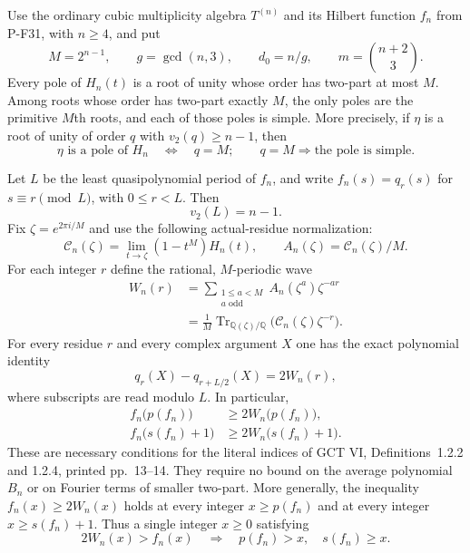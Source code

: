 \begin{proposition}
\label{prop:cubicpairedwave}
Use the ordinary cubic multiplicity algebra $T^{(n)}$ and its
Hilbert function $f_n$ from P-F31, with $n\ge4$, and put
\[
 M=2^{n-1},\qquad g=\gcd(n,3),\qquad d_0=n/g,
 \qquad m=\binom{n+2}{3}.
\]
Every pole of $H_n(t)$ is a root of unity whose order has
two-part at most $M$. Among roots whose order has two-part exactly
$M$, the only poles are the primitive $M$th roots, and each of
those poles is simple. More precisely, if $\eta$ is a root of
unity of order $q$ with $v_2(q)\ge n-1$, then
\[
 \eta\text{ is a pole of }H_n
       \quad\Longleftrightarrow\quad q=M;
 \qquad q=M\Longrightarrow\text{the pole is simple}.
 \tag{P-F56a}
\]

Let $L$ be the least quasipolynomial period of $f_n$, and write
$f_n(s)=q_r(s)$ for $s\equiv r\pmod L$, with
$0\le r<L$. Then
\[
                     v_2(L)=n-1.                            \tag{P-F56b}
\]
Fix $\zeta=e^{2\pi i/M}$ and use the following actual-residue normalization:
\[
 \mathcal C_n(\zeta)=\lim_{t\to\zeta}(1-t^M)H_n(t),
 \qquad A_n(\zeta)=\mathcal C_n(\zeta)/M.
\]
For each integer $r$ define the rational, $M$-periodic wave
\[
 \begin{split}
 W_n(r)
   &=\sum_{\substack{1\le a<M\\a\text{ odd}}}
                      A_n(\zeta^a)\zeta^{-ar}\\
   &=\frac1M\operatorname{Tr}_{\mathbb Q(\zeta)/\mathbb Q}
                  \bigl(\mathcal C_n(\zeta)\zeta^{-r}\bigr).
 \end{split}                                                 \tag{P-F56c}
\]
For every residue $r$ and every complex argument $X$ one has
the exact polynomial identity
\[
               q_r(X)-q_{r+L/2}(X)=2W_n(r),                 \tag{P-F56d}
\]
where subscripts are read modulo $L$. In particular,
\[
 \begin{split}
 f_n\bigl(p(f_n)\bigr)&\ge2W_n\bigl(p(f_n)\bigr),\\
 f_n\bigl(s(f_n)+1\bigr)&\ge2W_n\bigl(s(f_n)+1\bigr).
 \end{split}                                                 \tag{P-F56e}
\]
These are necessary conditions for the literal indices of
GCT VI, Definitions~1.2.2 and 1.2.4, printed pp.~13--14.
They require no bound on the average polynomial $B_n$ or on
Fourier terms of smaller two-part.
More generally, the inequality $f_n(x)\ge2W_n(x)$ holds
at every integer $x\ge p(f_n)$ and at every integer
$x\ge s(f_n)+1$. Thus a single integer $x\ge0$ satisfying
\[
          2W_n(x)>f_n(x)
       \quad\Longrightarrow\quad p(f_n)>x,
                                  \quad s(f_n)\ge x.
 \tag{P-F56e'}
\]


\end{proposition}
